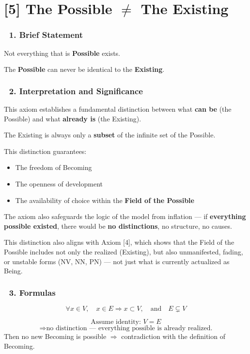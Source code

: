 \documentclass[12pt]{article}
\begin{document}
\section*{[5] The Possible $\neq$ The Existing}

\subsubsection*{🔹 1. Brief Statement}
Not everything that is \textbf{Possible} exists.

The \textbf{Possible} can never be identical to the \textbf{Existing}.

\subsubsection*{🔹 2. Interpretation and Significance}
This axiom establishes a fundamental distinction between what \textbf{can be} (the Possible) and what \textbf{already is} (the Existing).

The Existing is always only a \textbf{subset} of the infinite set of the Possible.

This distinction guarantees:
\begin{itemize}
\item The freedom of Becoming
\item The openness of development
\item The availability of choice within the \textbf{Field of the Possible}
\end{itemize}

The axiom also safeguards the logic of the model from inflation — if \textbf{everything possible existed}, there would be \textbf{no distinctions}, no structure, no causes.

This distinction also aligns with Axiom [4], which shows that the Field of the Possible includes not only the realized (Existing), but also unmanifested, fading, or unstable forms (NV, NN, PN) — not just what is currently actualized as Being.

\subsubsection*{🔹 3. Formulas}
\[
\forall x \in V,\quad x \in E \Rightarrow x \subset V,\quad \text{and} \quad E \subsetneq V
\]

\[
\text{Assume identity: } V = E 
\]
\[
\Rightarrow \text{no distinction — everything possible is already realized.}
\]
Then no new Becoming is possible $\Rightarrow$ contradiction with the definition of Becoming.
\end{document}
